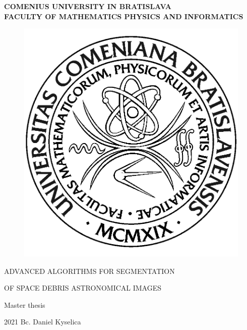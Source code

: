 \thispagestyle{empty}

\noindent
\begin{minipage}{\textwidth}
\begin{center}
\textbf{COMENIUS UNIVERSITY IN BRATISLAVA \\ FACULTY OF MATHEMATICS PHYSICS AND INFORMATICS}
\end{center}
\end{minipage}

\vfill
\begin{figure}[!hbt]
	\begin{center}
		\includegraphics{front_pages/images/logo_fmph}
		\label{img:logo}
	\end{center}
\end{figure}
\begin{center}
	\begin{minipage}{0.8\textwidth}
		\centerline{\Large\MakeUppercase{Advanced algorithms for segmentation}}
		\centerline{\Large\MakeUppercase{of space debris astronomical images}}

		\smallskip
		\centerline{Master thesis}
	\end{minipage}
\end{center}
\vfill
2021 \hfill
Bc. Daniel Kyselica
\eject 